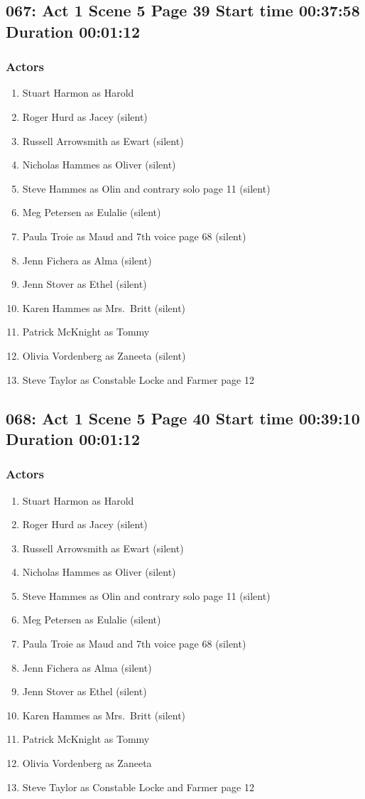 \subsection{067: Act 1 Scene 5 Page 39 Start time 00:37:58 Duration 00:01:12}

\subsubsection{Actors}
\begin{enumerate}
\item Stuart Harmon as Harold
\item Roger Hurd as Jacey (silent)
\item Russell Arrowsmith as Ewart (silent)
\item Nicholas Hammes as Oliver (silent)
\item Steve Hammes as Olin and contrary solo page 11 (silent)
\item Meg Petersen as Eulalie (silent)
\item Paula Troie as Maud and 7th voice page 68 (silent)
\item Jenn Fichera as Alma (silent)
\item Jenn Stover as Ethel (silent)
\item Karen Hammes as Mrs.~Britt (silent)
\item Patrick McKnight as Tommy
\item Olivia Vordenberg as Zaneeta (silent)
\item Steve Taylor as Constable Locke and Farmer page 12
\end{enumerate}


\subsection{068: Act 1 Scene 5 Page 40 Start time 00:39:10 Duration 00:01:12}

\subsubsection{Actors}
\begin{enumerate}
\item Stuart Harmon as Harold
\item Roger Hurd as Jacey (silent)
\item Russell Arrowsmith as Ewart (silent)
\item Nicholas Hammes as Oliver (silent)
\item Steve Hammes as Olin and contrary solo page 11 (silent)
\item Meg Petersen as Eulalie (silent)
\item Paula Troie as Maud and 7th voice page 68 (silent)
\item Jenn Fichera as Alma (silent)
\item Jenn Stover as Ethel (silent)
\item Karen Hammes as Mrs.~Britt (silent)
\item Patrick McKnight as Tommy
\item Olivia Vordenberg as Zaneeta
\item Steve Taylor as Constable Locke and Farmer page 12
\end{enumerate}


